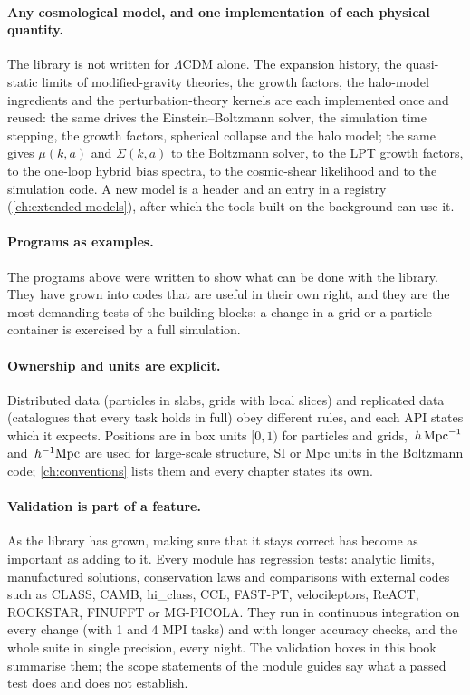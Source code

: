 \paragraph*{Any cosmological model, and one implementation of each physical quantity.} The library is not written for
$\Lambda$CDM alone. The expansion history, the quasi-static limits of modified-gravity theories, the growth factors,
the halo-model ingredients and the perturbation-theory kernels are each implemented once and reused: the same
 drives the Einstein--Boltzmann solver, the simulation time stepping, the growth factors, spherical
collapse and the halo model; the same  gives $\mu(k,a)$ and $\Sigma(k,a)$ to the Boltzmann
solver, to the LPT growth factors, to the one-loop hybrid bias spectra, to the cosmic-shear likelihood and to the
simulation code. A new model is a header and an entry in a registry (\cref{ch:extended-models}), after which the
tools built on the background can use it.

\paragraph*{Programs as examples.} The programs above were written to show what can be done with the library. They have
grown into codes that are useful in their own right, and they are the most demanding tests of the building blocks:
a change in a grid or a particle container is exercised by a full simulation.

\paragraph*{Ownership and units are explicit.} Distributed data (particles in slabs, grids with local slices) and
replicated data (catalogues that every task holds in full) obey different rules, and each API states which it
expects. Positions are in box units $[0,1)$ for particles and grids, $\,h\,\mathrm{Mpc}^{-1}$ and $\,h^{-1}\mathrm{Mpc}$ are used for large-scale
structure, SI or Mpc units in the Boltzmann code; \cref{ch:conventions} lists them and every chapter states its own.

\paragraph*{Validation is part of a feature.} As the library has grown, making sure that it stays correct has become
as important as adding to it. Every module has regression tests: analytic limits, manufactured solutions,
conservation laws and comparisons with external codes such as CLASS, CAMB, hi\_class, CCL, FAST-PT, velocileptors,
ReACT, ROCKSTAR, FINUFFT or MG-PICOLA. They run in continuous integration on every change (with 1 and 4 MPI tasks) and
with longer accuracy checks, and the whole suite in single precision, every night. The validation boxes in this book summarise them; the scope statements of the
module guides say what a passed test does and does not establish.

